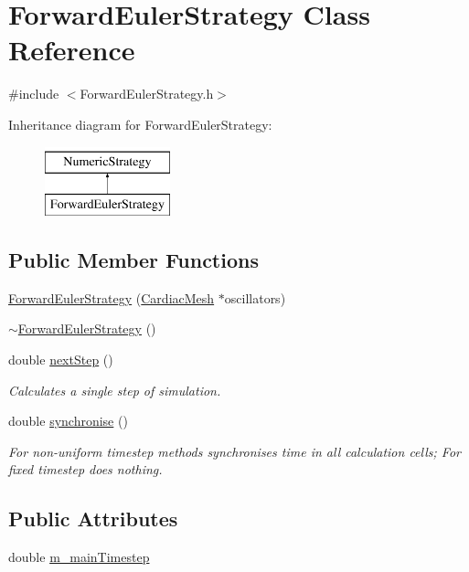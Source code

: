 \hypertarget{class_forward_euler_strategy}{\section{Forward\+Euler\+Strategy Class Reference}
\label{class_forward_euler_strategy}
}


{\ttfamily \#include $<$Forward\+Euler\+Strategy.\+h$>$}

Inheritance diagram for Forward\+Euler\+Strategy\+:\begin{figure}[H]
\begin{center}
\leavevmode
\includegraphics[height=2.000000cm]{class_forward_euler_strategy}
\end{center}
\end{figure}
\subsection*{Public Member Functions}
\begin{DoxyCompactItemize}
\item 
\hyperlink{class_forward_euler_strategy_a34072c0f458fb7946733717cf05956a4}{Forward\+Euler\+Strategy} (\hyperlink{class_cardiac_mesh}{Cardiac\+Mesh} $\ast$oscillators)
\item 
\hyperlink{class_forward_euler_strategy_a2c712bdc098b10499d8033b14302526c}{$\sim$\+Forward\+Euler\+Strategy} ()
\item 
double \hyperlink{class_forward_euler_strategy_a3a382585c2d87ffaf370c07c37737a28}{next\+Step} ()
\begin{DoxyCompactList}\small\item\em Calculates a single step of simulation. \end{DoxyCompactList}\item 
double \hyperlink{class_forward_euler_strategy_a59201ff29f82dd037576a1a7b3bf2e7f}{synchronise} ()
\begin{DoxyCompactList}\small\item\em For non-\/uniform timestep methods synchronises time in all calculation cells; For fixed timestep does nothing. \end{DoxyCompactList}\end{DoxyCompactItemize}
\subsection*{Public Attributes}
\begin{DoxyCompactItemize}
\item 
double \hyperlink{class_forward_euler_strategy_aa7cb67aa11fb16d4a76c1944ad3dbbc4}{m\+\_\+main\+Timestep}
\end{DoxyCompactItemize}


